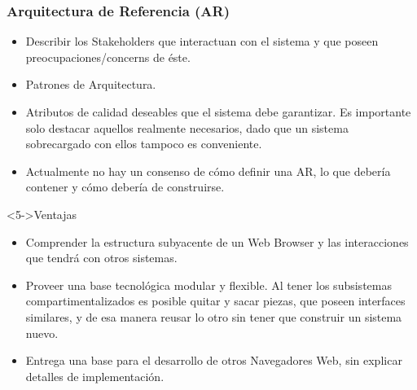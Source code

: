 \documentclass[serif,9pt]{beamer}
\begin{document}
\begin{frame}
	\frametitle{Arquitectura de Referencia (AR)}
	\begin{itemize}
		\item<1-> Describir los Stakeholders que interactuan con el sistema y que poseen preocupaciones/concerns de \'este.
		\item<2-> Patrones de Arquitectura.
		\item<3-> Atributos de calidad deseables que el sistema debe garantizar. Es importante solo destacar aquellos realmente necesarios, dado que un sistema sobrecargado con ellos tampoco es conveniente.
		\item<4-> Actualmente no hay un consenso de cómo definir una AR, lo que debería contener y cómo debería de construirse.
	\end{itemize}
	\begin{block}<5->{Ventajas}
		\begin{itemize}
			\item<6-> Comprender la estructura subyacente de un Web Browser y las interacciones que tendr\'a con otros sistemas.
			\item<7-> Proveer una base tecnol\'ogica modular y flexible. Al tener los subsistemas compartimentalizados es posible quitar y sacar piezas, que poseen interfaces similares, y de esa manera reusar lo otro sin tener que construir un sistema nuevo.
			\item<8-> Entrega una base para el desarrollo de otros Navegadores Web, sin explicar detalles de implementaci\'on.
		\end{itemize}
	\end{block}
\end{frame}
\end{document}
